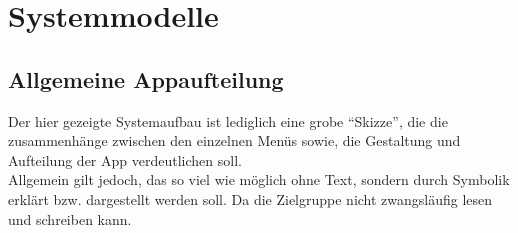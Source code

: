 \documentclass{scrartcl}
\begin{document}
\section{Systemmodelle}

\subsection{Allgemeine Appaufteilung}

Der hier gezeigte Systemaufbau ist lediglich eine grobe \enquote{Skizze},
die die zusammenhänge zwischen den einzelnen Menüs sowie, 
die Gestaltung und Aufteilung der App verdeutlichen soll.\\
Allgemein gilt jedoch, das so viel wie möglich ohne Text, sondern durch Symbolik erklärt bzw. dargestellt werden soll. Da die Zielgruppe nicht zwangsläufig lesen und schreiben kann.\\
\end{document}
